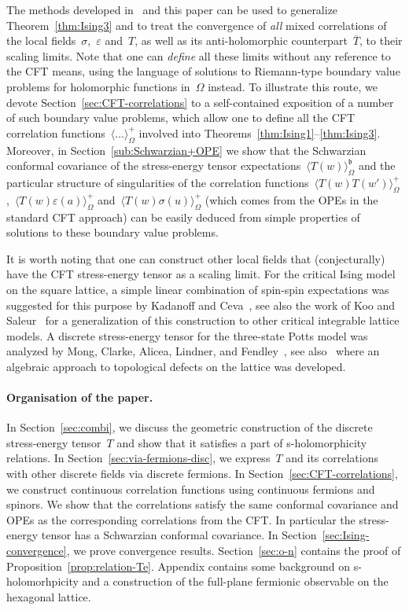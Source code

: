 \documentclass[reqno,11pt,a4paper]{amsart}
\theoremstyle{remark}
\renewcommand{\b}{\mathfrak{b}}
\newcommand\Corr[1]{\langle #1 \rangle}
\newcommand\CorrO[2][+]{\Corr{#2}_\Omega^{#1}}
\begin{document}
The methods developed in~\cite{CheSmi11,HonSmi13,Hon10,Izy11,CheHonIzy15} and this paper can be used to generalize Theorem~\ref{thm:Ising3} and to treat the convergence of \emph{all} mixed correlations of the local fields~$\sigma$,~$\varepsilon$ and~$T$, as well as its anti-holomorphic counterpart~$\overline{T}$, to their scaling limits. Note that one can \emph{define} all these limits without any reference to the CFT means, using the language of solutions to Riemann-type boundary value problems for holomorphic functions in~$\Omega$ instead. To illustrate this route, we devote Section~\ref{sec:CFT-correlations} to a self-contained exposition of a number of such boundary value problems, which allow one to define all the CFT correlation functions~$\CorrO{\dots}$ involved into Theorems~\mbox{\ref{thm:Ising1}--\ref{thm:Ising3}}. Moreover, in Section~\ref{sub:Schwarzian+OPE} we show that the Schwarzian conformal covariance of the stress-energy tensor expectations~$\Corr{T(w)}_\Omega^\b$ and the particular structure of singularities of the correlation functions~$\CorrO{T(w)T(w')}$,~$\CorrO{T(w)\varepsilon(a)}$ and~$\CorrO{T(w)\sigma(u)}$ (which comes from the OPEs in the standard CFT approach) can be easily deduced from simple properties of solutions to these boundary value problems.

It is worth noting that one can construct other local fields that (conjecturally) have the CFT stress-energy tensor as a scaling limit. For the critical Ising model on the square lattice, a simple linear combination of spin-spin expectations was suggested for this purpose by Kadanoff and Ceva~\cite{KadCev71}, see also the work of Koo and Saleur~\cite{KooSal94} for a generalization of this construction to other critical integrable lattice models.
A discrete stress-energy tensor for the three-state Potts model was analyzed by Mong, Clarke, Alicea, Lindner, and Fendley~\cite{MonClaAliLinFen14},
see also~\cite{AasMonFen16} where an algebraic approach to topological defects on the lattice was developed.

\paragraph{{\bf Organisation of the paper.}}
In Section~\ref{sec:combi}, we discuss the geometric construction of the discrete stress-energy tensor~$T$ and show that it satisfies a part of s-holomorphicity relations.
In Section~\ref{sec:via-fermions-disc}, we express~$T$ and its correlations with other discrete fields via discrete fermions.
In Section~\ref{sec:CFT-correlations}, we construct continuous correlation functions using continuous fermions and spinors.
We show that the correlations satisfy the same conformal covariance and OPEs as the corresponding correlations from the CFT.
In particular the stress-energy tensor has a Schwarzian conformal covariance.
In Section~\ref{sec:Ising-convergence}, we prove convergence results.
Section~\ref{sec:o-n} contains the proof of Proposition~\ref{prop:relation-Te}.
Appendix contains some background on s-holomorhpicity and a construction of the full-plane fermionic observable on the hexagonal lattice.
\end{document}
